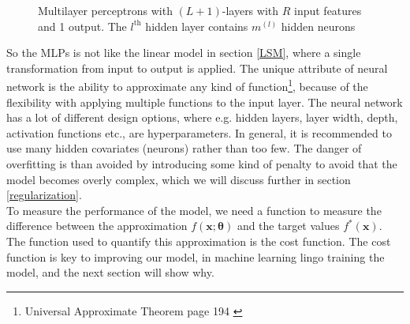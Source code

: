 \begin{figure}[th]
	\caption[Multilayer Perceptrons with $(L+1)$-layers]{Multilayer perceptrons with $(L+1)$-layers with $R$ input features and 1 output. The $l^{\text{th}}$ hidden layer contains $m^{(l)}$ hidden neurons}
	\label{fig:multilayer-perceptron}
\end{figure}

So the MLPs is not like the linear model in section \ref{LSM}, where a single transformation from input to output is applied. The unique attribute of neural network is the ability to approximate any kind of function\footnote{Universal Approximate Theorem page 194 \parencite{Goodfellow-et-al-2016}}, because of the flexibility with applying multiple functions to the input layer. The neural network has a lot of different design options, where e.g. hidden layers, layer width, depth, activation functions etc., are hyperparameters. In general, it is recommended to use many hidden covariates (neurons) rather than too few. The danger of overfitting is than avoided by introducing some kind of penalty to avoid that the model becomes overly complex, which we will discuss further in section \ref{regularization}.\\

To measure the performance of the model, we need a function to measure the difference between the approximation $f(\bm{x};\bm{\theta})$ and the target values $f^*(\bm{x})$. The function used to quantify this approximation is the cost function. The cost function is key to improving our model, in machine learning lingo training the model, and the next section will show why.

